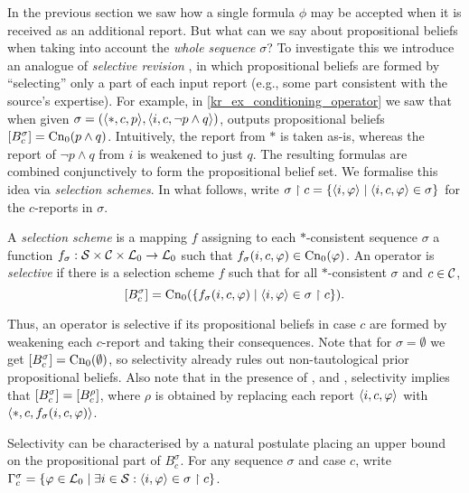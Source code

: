 In the previous section we saw how a single formula $\phi$ may be accepted when
it is received as an additional report. But what can we say about propositional
beliefs when taking into account the \emph{whole sequence} $\sigma$? To
investigate this we introduce an analogue of \emph{selective revision}
\cite{ferme1999selective}, in which propositional beliefs are formed by
``selecting'' only a part of each input report (e.g., some part consistent with
the source's expertise).
%
For example, in \cref{kr_ex_conditioning_operator} we saw that when given
$\sigma = (\langle {\ast, c, p} \rangle, \langle {i, c, \neg{p} \land q} \rangle)$, \varbasedcond{}
outputs propositional beliefs $\left[{B^\sigma_c}\right] = \operatorname{Cn}_0(p \land q)$.
Intuitively, the report from $\ast$ is taken as-is, whereas the report of
$\neg{p} \land q$ from $i$ is weakened to just $q$. The resulting formulas are
combined conjunctively to form the propositional belief set.
%
We formalise this idea via \emph{selection schemes}. In what follows, write
$\sigma \upharpoonright c = \{\langle {i, \varphi} \rangle \mid \langle {i, c, \varphi} \rangle \in \sigma\}$ for the
$c$-reports in $\sigma$.

\begin{definition}
    \label{kr_def_selectivity}
    A \emph{selection scheme} is a mapping $f$ assigning to each
    $\ast$-consistent sequence $\sigma$ a function $f_\sigma: \mathcal{S} \times \mathcal{C}
    \times \mathcal{L}{}_0 \to \mathcal{L}{}_0$ such that $f_\sigma(i, c, \varphi) \in
    \operatorname{Cn}_0(\varphi)$.
    An operator is \emph{selective} if there is a selection scheme $f$ such
    that for all $\ast$-consistent $\sigma$ and $c \in \mathcal{C}$,
    \[
        \left[{B^\sigma_c}\right] = \operatorname{Cn}_0(\{f_\sigma(i, c, \varphi) \mid \langle {i,
        \varphi} \rangle \in \sigma \upharpoonright c\}).
    \]
\end{definition}

Thus, an operator is selective if its propositional beliefs in case $c$ are
formed by weakening each $c$-report and taking their consequences. Note that for
$\sigma = \emptyset$ we get $\left[{B^\sigma_c}\right] = \operatorname{Cn}_0(\emptyset)$, so
selectivity already rules out non-tautological prior propositional beliefs.
Also note that in the presence of \closure{}, \containment{} and \soundness{},
selectivity implies that $\left[{B^\sigma_c}\right] = \left[{B^\rho_c}\right]$, where
$\rho$ is obtained by replacing each report $\langle {i, c, \varphi} \rangle$ with
$\langle {\ast, c, f_\sigma(i, c, \varphi)} \rangle$.

Selectivity can be characterised by a natural postulate placing an upper bound
on the propositional part of $B^\sigma_c$. For any sequence $\sigma$ and case
$c$, write $\Gamma^\sigma_c = \{\varphi \in \mathcal{L}{}_0 \mid \exists i \in \mathcal{S}:
\langle {i, \varphi} \rangle \in \sigma \upharpoonright c\}$.

